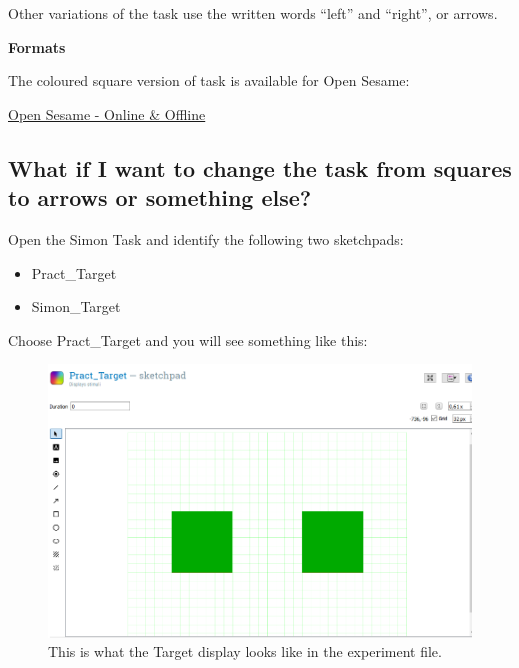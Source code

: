 \documentclass[
]{book}
\begin{document}
Other variations of the task use the written words ``left'' and ``right'', or arrows.

\textbf{Formats}

The coloured square version of task is available for Open Sesame:

\href{GitHub/SimonTask.osexp}{Open Sesame - Online \& Offline}

\hypertarget{what-if-i-want-to-change-the-task-from-squares-to-arrows-or-something-else}{%
\subsection{What if I want to change the task from squares to arrows or something else?}\label{what-if-i-want-to-change-the-task-from-squares-to-arrows-or-something-else}}

Open the Simon Task and identify the following two sketchpads:

\begin{itemize}
\item
  Pract\_Target
\item
  Simon\_Target
\end{itemize}

Choose Pract\_Target and you will see something like this:

\begin{figure}

{\centering \includegraphics[width=0.99\linewidth]{images/changesimon/01Pract_Target} 

}

\caption{This is what the Target display looks like in the experiment file.}\label{fig:Figure3-5}
\end{figure}
\end{document}
